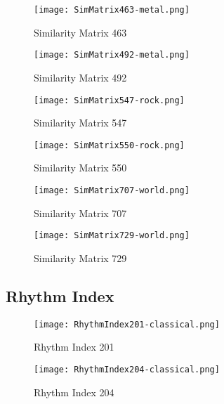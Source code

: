 \documentclass{article} %
\begin{document}
\begin{figure}[H]
\centering
\texttt{[image: SimMatrix463-metal.png]}
\caption{Similarity Matrix 463}
\label{fig:sim463_1}
\end{figure}

\begin{figure}[H]
\centering
\texttt{[image: SimMatrix492-metal.png]}
\caption{Similarity Matrix 492}
\label{fig:sim492_1}
\end{figure}

\begin{figure}[H]
\centering
\texttt{[image: SimMatrix547-rock.png]}
\caption{Similarity Matrix 547}
\label{fig:sim547_1}
\end{figure}

\begin{figure}[H]
\centering
\texttt{[image: SimMatrix550-rock.png]}
\caption{Similarity Matrix 550}
\label{fig:sim550_1}
\end{figure}

\begin{figure}[H]
\centering
\texttt{[image: SimMatrix707-world.png]}
\caption{Similarity Matrix 707}
\label{fig:sim707_1}
\end{figure}

\begin{figure}[H]
\centering
\texttt{[image: SimMatrix729-world.png]}
\caption{Similarity Matrix 729}
\label{fig:sim729_1}
\end{figure}






\subsection{Rhythm Index}
\label{sec:rhythmFig}


\begin{figure}[H]
\centering
\texttt{[image: RhythmIndex201-classical.png]}
\caption{Rhythm Index 201}
\label{fig:rhy201_1}
\end{figure}

\begin{figure}[H]
\centering
\texttt{[image: RhythmIndex204-classical.png]}
\caption{Rhythm Index 204}
\label{fig:rhy204_1}
\end{figure}
\end{document}

